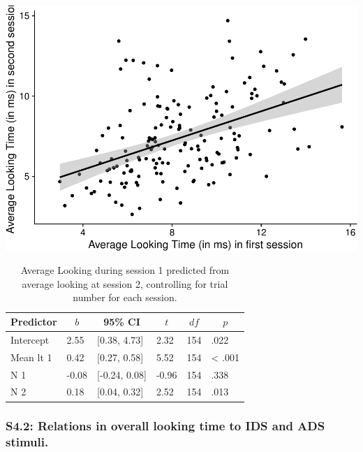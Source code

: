\documentclass[
  man, donotrepeattitle,floatsintext]{apa6}
\begin{document}
\includegraphics{MB1T_supplement_files/figure-latex/unnamed-chunk-4-1.pdf}

\begin{table}[tbp]

\begin{center}
\begin{threeparttable}

\caption{\label{tab:unnamed-chunk-4}Average Looking during session 1 predicted from average looking at session 2, controlling for trial number for each session.}

\begin{tabular}{llllll}
\toprule
Predictor & \multicolumn{1}{c}{$b$} & \multicolumn{1}{c}{95\% CI} & \multicolumn{1}{c}{$t$} & \multicolumn{1}{c}{$\mathit{df}$} & \multicolumn{1}{c}{$p$}\\
\midrule
Intercept & 2.55 & {}[0.38, 4.73] & 2.32 & 154 & .022\\
Mean lt 1 & 0.42 & {}[0.27, 0.58] & 5.52 & 154 & < .001\\
N 1 & -0.08 & {}[-0.24, 0.08] & -0.96 & 154 & .338\\
N 2 & 0.18 & {}[0.04, 0.32] & 2.52 & 154 & .013\\
\bottomrule
\end{tabular}

\end{threeparttable}
\end{center}

\end{table}

\hypertarget{s4.2-relations-in-overall-looking-time-to-ids-and-ads-stimuli.}{%
\subsubsection{S4.2: Relations in overall looking time to IDS and ADS stimuli.}\label{s4.2-relations-in-overall-looking-time-to-ids-and-ads-stimuli.}}
\end{document}
